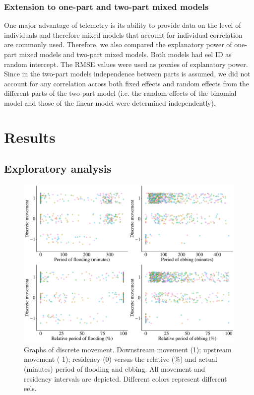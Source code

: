 \documentclass[preprint,12pt,authoryear]{elsarticle}
\begin{document}
\subsubsection{Extension to one-part and two-part mixed models}

One major advantage of telemetry is its ability to provide data on the level of individuals and therefore mixed models that account for individual correlation are commonly used. Therefore, we also compared the explanatory power of one-part mixed models and two-part mixed models. Both models had eel ID as random intercept. The RMSE values were used as proxies of explanatory power. Since in the two-part models independence between parts is assumed, we did not account for any correlation across both fixed effects and random effects from the different parts of the two-part model (i.e. the random effects of the binomial model and those of the linear model were determined independently). 

\section{Results}

\subsection{Exploratory analysis}
\label{sect:explor}

\begin{figure}[h!]
  \centering\includegraphics[scale=0.45]{Distance_versus_floodebb.pdf}
  \caption{Graphs of discrete movement. Downstream movement (1); upstream movement (-1); residency (0) versus the relative (\%) and actual (minutes) period of flooding and ebbing. All movement and residency intervals are depicted. Different colors represent different eels.}
  \label{fig:Distance_versus_floodebb}
\end{figure}
\end{document}
